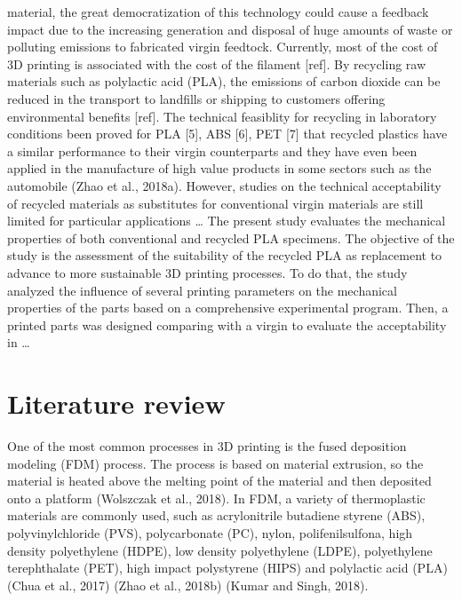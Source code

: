 \documentclass[]{elsarticle} %
\begin{document}
material, the great democratization of this technology could cause a
feedback impact due to the increasing generation and disposal of huge
amounts of waste or polluting emissions to fabricated virgin feedtock.
Currently, most of the cost of 3D printing is associated with the cost
of the filament {[}ref{]}. By recycling raw materials such as polylactic
acid (PLA), the emissions of carbon dioxide can be reduced in the
transport to landfills or shipping to customers offering environmental
benefits {[}ref{]}. The technical feasiblity for recycling in laboratory
conditions been proved for PLA {[}5{]}, ABS {[}6{]}, PET {[}7{]} that
recycled plastics have a similar performance to their virgin
counterparts and they have even been applied in the manufacture of high
value products in some sectors such as the automobile (Zhao et al.,
2018a). However, studies on the technical acceptability of recycled
materials as substitutes for conventional virgin materials are still
limited for particular applications \ldots{} The present study evaluates
the mechanical properties of both conventional and recycled PLA
specimens. The objective of the study is the assessment of the
suitability of the recycled PLA as replacement to advance to more
sustainable 3D printing processes. To do that, the study analyzed the
influence of several printing parameters on the mechanical properties of
the parts based on a comprehensive experimental program. Then, a printed
parts was designed comparing with a virgin to evaluate the acceptability
in \ldots{}

\hypertarget{literature-review}{%
\section{Literature review}\label{literature-review}}

One of the most common processes in 3D printing is the fused deposition
modeling (FDM) process. The process is based on material extrusion, so
the material is heated above the melting point of the material and then
deposited onto a platform (Wolszczak et al., 2018). In FDM, a variety of
thermoplastic materials are commonly used, such as acrylonitrile
butadiene styrene (ABS), polyvinylchloride (PVS), polycarbonate (PC),
nylon, polifenilsulfona, high density polyethylene (HDPE), low density
polyethylene (LDPE), polyethylene terephthalate (PET), high impact
polystyrene (HIPS) and polylactic acid (PLA) (Chua et al., 2017) (Zhao
et al., 2018b) (Kumar and Singh, 2018).
\end{document}
